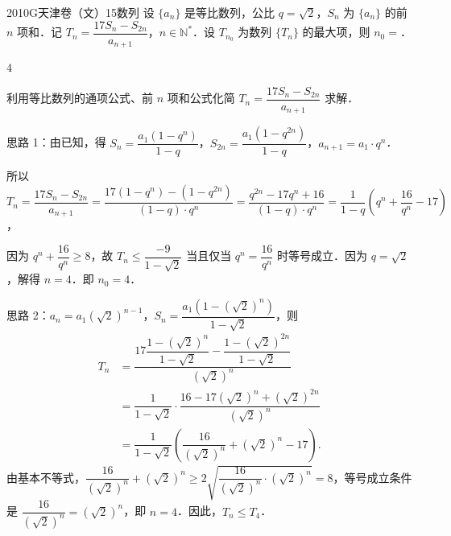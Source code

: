 
\begin{problem}{2010}{G}{天津卷（文）}{15}{数列}
设 $\{a_n\}$ 是等比数列，公比 $q=\sqrt{2}$，$S_n$ 为 $\{a_n\}$ 的前 $n$ 项和．记 $T_n=\dfrac{17S_n-S_{2n}}{a_{n+1}}$，$n\in\mathbb{N}^*$．设 $T_{n_0}$ 为数列 $\{T_n\}$ 的最大项，则 $n_0=$\underline{\hspace{4em}}．
\end{problem}

\begin{answer}
$4$
\end{answer}

\begin{solutions}
利用等比数列的通项公式、前 $n$ 项和公式化简 $T_n=\dfrac{17S_n-S_{2n}}{a_{n+1}}$ 求解．

思路 1：由已知，得 $S_n=\dfrac{a_1(1-q^n)}{1-q}$，$S_{2n}=\dfrac{a_1(1-q^{2n})}{1-q}$，$a_{n+1}=a_1\cdot q^n$．

所以 $T_n=\dfrac{17S_n-S_{2n}}{a_{n+1}}=\dfrac{17(1-q^n)-(1-q^{2n})}{(1-q)\cdot q^n}=\dfrac{q^{2n}-17q^n+16}{(1-q)\cdot q^n}=\dfrac{1}{1-q}\left(q^n+\dfrac{16}{q^n}-17\right)$，

因为 $q^n+\dfrac{16}{q^n}\geqslant 8$，故 $T_n\leqslant\dfrac{-9}{1-\sqrt{2}}$ 当且仅当 $q^n=\dfrac{16}{q^n}$ 时等号成立．因为 $q=\sqrt{2}$，解得 $n=4$．即 $n_0=4$．

思路 2：$a_n=a_1(\sqrt{2})^{n-1}$，$S_n=\dfrac{a_1(1-(\sqrt{2})^n)}{1-\sqrt{2}}$，则
$$
\begin{aligned}
T_n&=\dfrac{17\dfrac{1-(\sqrt{2})^n}{1-\sqrt{2}}-\dfrac{1-(\sqrt{2})^{2n}}{1-\sqrt{2}}}{(\sqrt{2})^n}\\
&=\dfrac{1}{1-\sqrt{2}}\cdot\dfrac{16-17(\sqrt{2})^n+(\sqrt{2})^{2n}}{(\sqrt{2})^n}\\
&=\dfrac{1}{1-\sqrt{2}}\left(\dfrac{16}{(\sqrt{2})^n}+(\sqrt{2})^n-17\right).
\end{aligned}
$$
由基本不等式，$\dfrac{16}{(\sqrt{2})^n}+(\sqrt{2})^n\geqslant 2\sqrt{\dfrac{16}{(\sqrt{2})^n}\cdot(\sqrt{2})^n}=8$，等号成立条件是 $\dfrac{16}{(\sqrt{2})^n}=(\sqrt{2})^n$，即 $n=4$．因此，$T_n\leqslant T_4$．
\end{solutions}